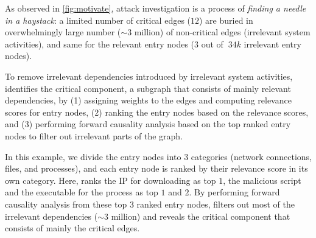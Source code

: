 As observed in \cref{fig:motivate}, attack investigation is a process of \emph{finding a needle in a haystack}: 
a limited number of critical edges (\ie $12$) are buried in overwhelmingly large number ($\sim 3$ million) of non-critical edges (\eg irrelevant system activities), and same for the relevant entry nodes (\ie $3$ out of $~34k$ irrelevant entry nodes).



To remove irrelevant dependencies introduced by irrelevant system activities, \tool identifies the critical component, a subgraph that consists of mainly relevant dependencies, by (1) assigning weights to the edges and computing relevance scores for entry nodes, (2) ranking the entry nodes based on the relevance scores, and (3) performing forward causality analysis based on the top ranked entry nodes to filter out irrelevant parts of the graph.

In this example, we divide the entry nodes into $3$ categories (\ie network connections, files, and processes), and each entry node is ranked by their relevance score in its own category.
Here, \tool ranks the IP  for  downloading as top $1$, the malicious script  and the executable  for the process  as top $1$ and $2$.
By performing forward causality analysis from these top 3 ranked entry nodes, \tool filters out most of the irrelevant dependencies ($\sim 3$ million) and reveals the critical component that consists of mainly the critical edges.




